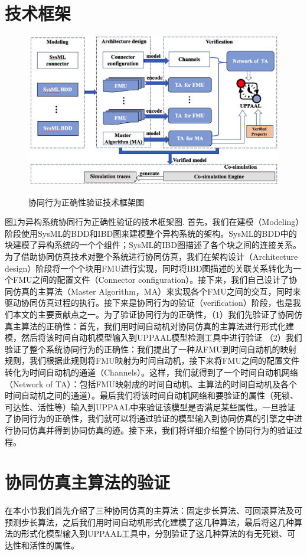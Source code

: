 \section{技术框架}
\begin{figure}[htbp]
	\centering
	{\includegraphics[width=6.0in]{fig/3/framework-3.jpg}}
	\caption{协同行为正确性验证技术框架图}\label{fra-3}
\end{figure}
图\ref{fra-3}为异构系统协同行为正确性验证的技术框架图. 首先，我们在建模（Modeling）阶段使用SysML的BDD和IBD图来建模整个异构系统的架构。SysML的BDD中的块建模了异构系统的一个个组件；SysML的IBD图描述了各个块之间的连接关系。为了借助协同仿真技术对整个系统进行协同仿真，我们在架构设计（Architecture design）阶段将一个个块用FMU进行实现，同时将IBD图描述的关联关系转化为一个FMU之间的配置文件（Connector configuration）。接下来，我们自己设计了协同仿真的主算法（Master Algorithm，MA）来实现各个FMU之间的交互，同时来驱动协同仿真过程的执行。接下来是协同行为的验证（verification）阶段，也是我们本文的主要贡献点之一。为了验证协同行为的正确性，（1）我们先验证了协同仿真主算法的正确性：首先，我们用时间自动机对协同仿真的主算法进行形式化建模，然后将该时间自动机模型输入到UPPAAL模型检测工具中进行验证 （2）我们验证了整个系统协同行为的正确性：我们提出了一种从FMU到时间自动机的映射规则，我们根据此规则将FMU映射为时间自动机，接下来将FMU之间的配置文件转化为时间自动机的通道（Channels）。这样，我们就得到了一个时间自动机网络（Network of
TA）：包括FMU映射成的时间自动机、主算法的时间自动机及各个时间自动机之间的通道）。最后我们将该时间自动机网络和要验证的属性（死锁、可达性、活性等）输入到UPPAAL中来验证该模型是否满足某些属性。一旦验证了协同行为的正确性，我们就可以将通过验证的模型输入到协同仿真的引擎之中进行协同仿真并得到协同仿真的迹。接下来，我们将详细介绍整个协同行为的验证过程。
\section{协同仿真主算法的验证}
在本小节我们首先介绍了三种协同仿真的主算法：固定步长算法、可回滚算法及可预测步长算法，之后我们用时间自动机形式化建模了这几种算法，最后将这几种算法的形式化模型输入到UPPAAL工具中，分别验证了这几种算法的有无死锁、可达性和活性的属性。
